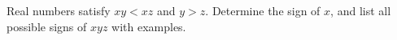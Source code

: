 Real numbers satisfy $ xy<xz $ and $ y>z $. Determine the sign of $ x $, and list all possible signs of $ xyz $ with examples.
